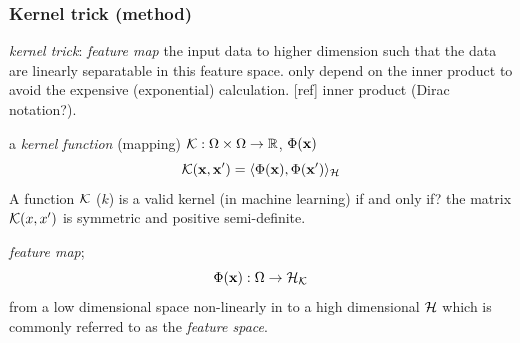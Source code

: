 \subsubsection*{Kernel trick (method)}
\emph{kernel trick}: \emph{feature map} the input data to higher dimension such that the data are linearly separatable in this feature space.
only depend on the inner product to avoid the expensive (exponential) calculation. [ref]
inner product (Dirac notation?).
\begin{definition}\label{def:kernel}
	a \emph{kernel function} (mapping) $\mathcal{K}: \Omega\times\Omega\to\mathbb{R}$,
	 $\Phi(\vb{x})$
	\begin{equation}
		\mathcal{K}(\vb{x},\vb{x}') = \langle \Phi(\vb{x}),\Phi(\vb{x}') \rangle_{\mathcal{H}}
		\label{eq:kernel_classical}
	\end{equation}
	A function $\mathcal{K}$ ($k$) is a valid kernel (in machine learning) if and only if? the matrix $\mathcal{K}(x,x')$ is symmetric and positive semi-definite.
\end{definition}
\begin{definition}\label{def:feature_map_classical}
	\emph{feature map};
	\begin{equation}
		\Phi(\vb{x}) : \Omega \to \mathcal{H}_{\mathcal{K}}
		\label{eq:feature_map_classical}
	\end{equation}
	from a low dimensional space non-linearly in to a high dimensional  $\mathcal{H}$ which is commonly referred to as the \emph{feature space}.
\end{definition}
